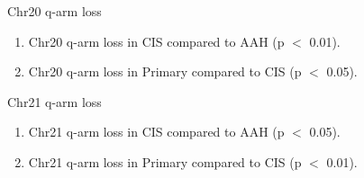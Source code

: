 \documentclass{beamer}
\begin{document}
\begin{frame}[allowframebreaks]
                \begin{block}{Chr20 q-arm loss}
                    \begin{enumerate}
                        \item Chr20 q-arm loss in CIS compared to AAH (p $<$ 0.01).
                        \item Chr20 q-arm loss in Primary compared to CIS (p $<$ 0.05).
                    \end{enumerate}

                    \begin{table}
                        \caption{CGC Tier1 genes in Chr20 q-arm}
                        \resizebox{\linewidth}{!}
                        {}
                    \end{table}
                \end{block}

                \begin{block}{Chr21 q-arm loss}
                    \begin{enumerate}
                        \item Chr21 q-arm loss in CIS compared to AAH (p $<$ 0.05).
                        \item Chr21 q-arm loss in Primary compared to CIS (p $<$ 0.01).
                    \end{enumerate}

                    \begin{table}
                        \caption{CGC Tier1 genes in Chr21 q-arm}
                        \resizebox{\linewidth}{!}
                        {}
                    \end{table}
                \end{block}
            \end{frame}
\end{document}
